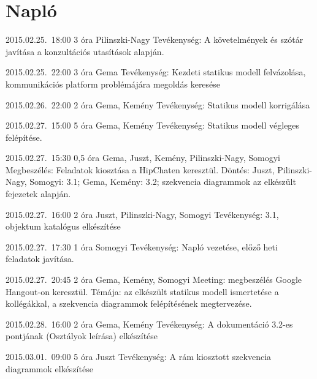 %
\section{Napló}

\begin{naplo}

\bejegyzes
{2015.02.25.~18:00} %
{3 óra} %
{Pilinszki-Nagy} %
{Tevékenység: A követelmények és szótár javítása a konzultációs utasítások alapján.} %

\bejegyzes
{2015.02.25.~22:00}
{3 óra}
{Gema}
{Tevékenység: Kezdeti statikus modell felvázolása, kommunikációs platform problémájára megoldás keresése}

\bejegyzes
{2015.02.26.~22:00}
{2 óra}
{Gema, Kemény}
{Tevékenység: Statikus modell korrigálása}

\bejegyzes
{2015.02.27.~15:00} %
{5 óra} %
{Gema, Kemény} %
{Tevékenység: Statikus modell végleges felépítése.} %

\bejegyzes
{2015.02.27.~15:30} %
{0,5 óra} %
{Gema, Juszt, Kemény, Pilinszki-Nagy, Somogyi} %
{Megbeszélés: Feladatok kiosztása a HipChaten keresztül. Döntés: Juszt, Pilinszki-Nagy, Somogyi: 3.1; Gema, Kemény: 3.2; szekvencia diagrammok az elkészült fejezetek alapján.} %

\bejegyzes
{2015.02.27.~16:00} %
{2 óra} %
{Juszt, Pilinszki-Nagy, Somogyi} %
{Tevékenység: 3.1, objektum katalógus elkészítése} %

\bejegyzes
{2015.02.27.~17:30} %
{1 óra} %
{Somogyi} %
{Tevékenység: Napló vezetése, előző heti feladatok javítása.} %

\bejegyzes
{2015.02.27.~20:45} %
{2 óra} %
{Gema, Kemény, Somogyi} %
{Meeting: megbeszélés Google Hangout-on keresztül. Témája: az elkészült statikus modell ismertetése a kollégákkal, a szekvencia diagrammok felépítésének megtervezése.} %

\bejegyzes
{2015.02.28.~16:00}
{2 óra}
{Gema, Kemény}
{Tevékenység: A dokumentáció 3.2-es pontjának (Osztályok leírása) elkészítése}

\bejegyzes
{2015.03.01.~09:00}
{5 óra}
{Juszt}
{Tevékenység: A rám kiosztott szekvencia diagrammok elkészítése}


\end{naplo}

